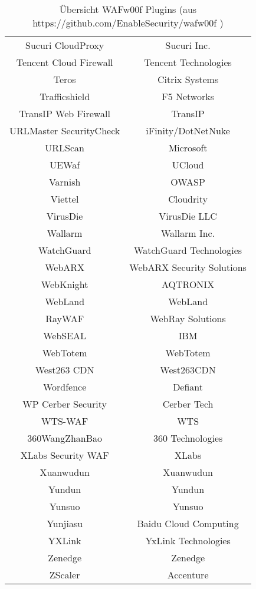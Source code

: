 \begin{table}[h]
\begin{tabular}{|c | c |}
  Sucuri CloudProxy               & Sucuri Inc.\\
  Tencent Cloud Firewall          & Tencent Technologies\\
  Teros                           & Citrix Systems\\
      Trafficshield                   & F5 Networks\\
      TransIP Web Firewall            & TransIP\\
  URLMaster SecurityCheck         & iFinity/DotNetNuke\\
  URLScan                         & Microsoft\\
  UEWaf                           & UCloud\\
  Varnish                         & OWASP\\
  Viettel                         & Cloudrity\\
  VirusDie                        & VirusDie LLC\\
  Wallarm                         & Wallarm Inc.\\
  WatchGuard                      & WatchGuard Technologies\\
  WebARX                          & WebARX Security Solutions\\
  WebKnight                       & AQTRONIX\\
  WebLand                         & WebLand\\
  RayWAF                          & WebRay Solutions\\
  WebSEAL                         & IBM\\
  WebTotem                        & WebTotem\\
  West263 CDN                     & West263CDN\\
  Wordfence                       & Defiant\\
  WP Cerber Security              & Cerber Tech\\
  WTS-WAF                         & WTS\\
  360WangZhanBao                  & 360 Technologies\\
  XLabs Security WAF              & XLabs\\
  Xuanwudun                       & Xuanwudun\\
  Yundun                          & Yundun\\
  Yunsuo                          & Yunsuo\\
  Yunjiasu                        & Baidu Cloud Computing\\
  YXLink                          & YxLink Technologies\\
  Zenedge                         & Zenedge\\
  ZScaler                         & Accenture\\
      \hline
      
      
\end{tabular}
    \caption{Übersicht WAFw00f Plugins (aus https://github.com/EnableSecurity/wafw00f ) }
    \label{tab:my_label}
\end{table}


